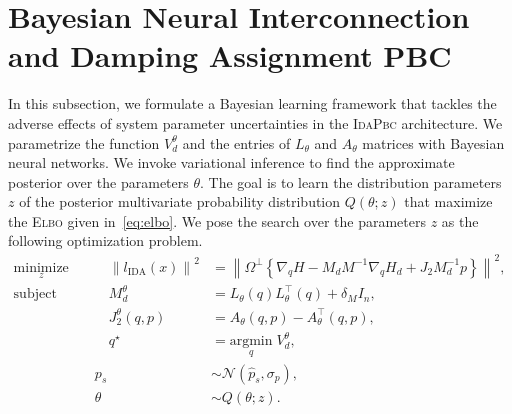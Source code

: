 
\section{Bayesian Neural Interconnection and Damping Assignment PBC}

In this subsection, we formulate a Bayesian learning framework that tackles the
adverse effects of system parameter uncertainties in the \textsc{IdaPbc}
architecture.
%
We parametrize the function $V_d^\theta$ and the entries of $L_\theta$ and
$A_\theta$ matrices with Bayesian neural networks. 
%
We invoke variational inference to find the approximate posterior over the
parameters $\theta$. The goal is to learn the distribution parameters $z$ of the
posterior multivariate probability distribution $Q(\theta;z)$ that maximize the
\textsc{Elbo} given in~\eqref{eq:elbo}.
%
We pose the search over the parameters $z$ as the following optimization problem.
\begin{equation}
    \begin{aligned}
        \underset{z }{\textrm{minimize}} 
        &&\quad \left\| l_{\textrm{IDA}} (x) \right\|^2 &= \left\| \Omega^\perp \left\{ \nabla_qH - M_dM^{-1} \nabla_qH_d + J_2M_d^{-1}p \right\} \right\|^2, \\
        \textrm{subject to}
        &&\quad M^\theta_d &= L_{\theta}(q)L_{\theta}^\top(q) + \delta_M I_n, \\
        &&\quad J_2^\theta(q, p) &= A_\theta(q, p) - A^\top_\theta(q, p), \\
        &&\quad q^\star &= \underset{q}{\textrm{argmin}}\; V_d^\theta, \\
        &&p_s &\sim \mathcal{N}(\hat{p}_s, \sigma_p), \\
        &&\theta &\sim Q(\theta; z).
    \end{aligned}    
    \label{eq:bayesian_idapbc}%
  \end{equation}

